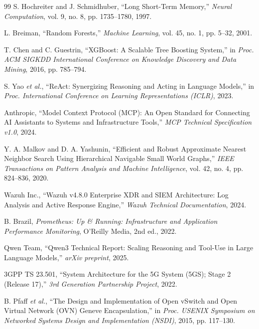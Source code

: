 \begin{thebibliography}{99}
S. Hochreiter and J. Schmidhuber, ``Long Short-Term Memory,'' \textit{Neural Computation}, vol. 9, no. 8, pp. 1735--1780, 1997.

L. Breiman, ``Random Forests,'' \textit{Machine Learning}, vol. 45, no. 1, pp. 5--32, 2001.

T. Chen and C. Guestrin, ``XGBoost: A Scalable Tree Boosting System,'' in \textit{Proc. ACM SIGKDD International Conference on Knowledge Discovery and Data Mining}, 2016, pp. 785--794.

S. Yao \textit{et al.}, ``ReAct: Synergizing Reasoning and Acting in Language Models,'' in \textit{Proc. International Conference on Learning Representations (ICLR)}, 2023.

Anthropic, ``Model Context Protocol (MCP): An Open Standard for Connecting AI Assistants to Systems and Infrastructure Tools,'' \textit{MCP Technical Specification v1.0}, 2024.

Y. A. Malkov and D. A. Yashunin, ``Efficient and Robust Approximate Nearest Neighbor Search Using Hierarchical Navigable Small World Graphs,'' \textit{IEEE Transactions on Pattern Analysis and Machine Intelligence}, vol. 42, no. 4, pp. 824--836, 2020.

Wazuh Inc., ``Wazuh v4.8.0 Enterprise XDR and SIEM Architecture: Log Analysis and Active Response Engine,'' \textit{Wazuh Technical Documentation}, 2024.

B. Brazil, \textit{Prometheus: Up \& Running: Infrastructure and Application Performance Monitoring}, O'Reilly Media, 2nd ed., 2022.

Qwen Team, ``Qwen3 Technical Report: Scaling Reasoning and Tool-Use in Large Language Models,'' \textit{arXiv preprint}, 2025.

3GPP TS 23.501, ``System Architecture for the 5G System (5GS); Stage 2 (Release 17),'' \textit{3rd Generation Partnership Project}, 2022.

B. Pfaff \textit{et al.}, ``The Design and Implementation of Open vSwitch and Open Virtual Network (OVN) Geneve Encapsulation,'' in \textit{Proc. USENIX Symposium on Networked Systems Design and Implementation (NSDI)}, 2015, pp. 117--130.

\end{thebibliography}
